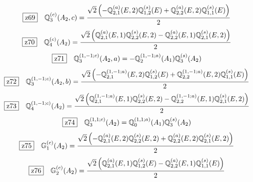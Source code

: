 \documentclass[fleqn,10pt,landscape]{jsarticle}
\begin{document}
\begin{dmath*}
\hspace*{3mm}\fbox{z69}\quad \mathbb{Q}_{3}^{(c)}(A_{2},c)=\frac{\sqrt{2} \left(- \mathbb{Q}_{2,1}^{(a)}(E,2) \mathbb{Q}_{1,2}^{(s)}(E) + \mathbb{Q}_{2,2}^{(a)}(E,2) \mathbb{Q}_{1,1}^{(s)}(E)\right)}{2}
\end{dmath*}
\begin{dmath*}
\hspace*{3mm}\fbox{z70}\quad \mathbb{Q}_{4}^{(c)}(A_{2})=\frac{\sqrt{2} \left(\mathbb{Q}_{2,1}^{(a)}(E,1) \mathbb{Q}_{2,2}^{(s)}(E,2) - \mathbb{Q}_{2,2}^{(a)}(E,1) \mathbb{Q}_{2,1}^{(s)}(E,2)\right)}{2}
\end{dmath*}
\begin{dmath*}
\hspace*{3mm}\fbox{z71}\quad \mathbb{Q}_{3}^{(1,-1;c)}(A_{2},a)=- \mathbb{Q}_{2}^{(1,-1;a)}(A_{1}) \mathbb{Q}_{3}^{(s)}(A_{2})
\end{dmath*}
\begin{dmath*}
\hspace*{3mm}\fbox{z72}\quad \mathbb{Q}_{3}^{(1,-1;c)}(A_{2},b)=\frac{\sqrt{2} \left(- \mathbb{Q}_{2,1}^{(1,-1;a)}(E,2) \mathbb{Q}_{1,2}^{(s)}(E) + \mathbb{Q}_{2,2}^{(1,-1;a)}(E,2) \mathbb{Q}_{1,1}^{(s)}(E)\right)}{2}
\end{dmath*}
\begin{dmath*}
\hspace*{3mm}\fbox{z73}\quad \mathbb{Q}_{4}^{(1,-1;c)}(A_{2})=\frac{\sqrt{2} \left(\mathbb{Q}_{2,1}^{(1,-1;a)}(E,1) \mathbb{Q}_{2,2}^{(s)}(E,2) - \mathbb{Q}_{2,2}^{(1,-1;a)}(E,1) \mathbb{Q}_{2,1}^{(s)}(E,2)\right)}{2}
\end{dmath*}
\begin{dmath*}
\hspace*{3mm}\fbox{z74}\quad \mathbb{Q}_{3}^{(1,1;c)}(A_{2})=\mathbb{Q}_{0}^{(1,1;a)}(A_{1}) \mathbb{Q}_{3}^{(s)}(A_{2})
\end{dmath*}
\begin{dmath*}
\hspace*{3mm}\fbox{z75}\quad \mathbb{G}_{1}^{(c)}(A_{2})=\frac{\sqrt{2} \left(- \mathbb{Q}_{2,1}^{(a)}(E,2) \mathbb{Q}_{2,2}^{(s)}(E,2) + \mathbb{Q}_{2,2}^{(a)}(E,2) \mathbb{Q}_{2,1}^{(s)}(E,2)\right)}{2}
\end{dmath*}
\begin{dmath*}
\hspace*{3mm}\fbox{z76}\quad \mathbb{G}_{2}^{(c)}(A_{2})=\frac{\sqrt{2} \left(\mathbb{Q}_{2,1}^{(a)}(E,1) \mathbb{Q}_{1,2}^{(s)}(E) - \mathbb{Q}_{2,2}^{(a)}(E,1) \mathbb{Q}_{1,1}^{(s)}(E)\right)}{2}
\end{dmath*}
\end{document}
